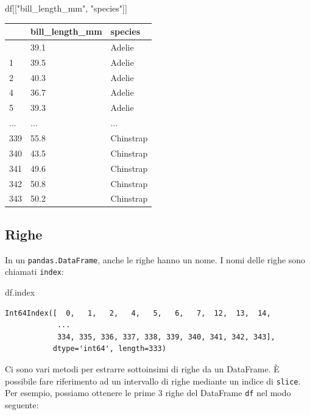 \documentclass[
  letterpaper,
  krantz2]{{[}./krantz{]}}
\newenvironment{Shaded}{\begin{snugshade}}{\end{snugshade}}
\newcommand{\NormalTok}[1]{\textcolor[rgb]{0.00,0.23,0.31}{#1}}
\newcommand{\StringTok}[1]{\textcolor[rgb]{0.13,0.47,0.30}{#1}}
\begin{document}
\begin{Shaded}
\begin{Highlighting}[]
\NormalTok{df[[}\StringTok{"bill\_length\_mm"}\NormalTok{, }\StringTok{"species"}\NormalTok{]]}
\end{Highlighting}
\end{Shaded}

\begin{longtable}[]{@{}lll@{}}
\toprule\noalign{}
& bill\_length\_mm & species \\
\midrule\noalign{}
\endhead
\bottomrule\noalign{}
\endlastfoot
0 & 39.1 & Adelie \\
1 & 39.5 & Adelie \\
2 & 40.3 & Adelie \\
4 & 36.7 & Adelie \\
5 & 39.3 & Adelie \\
... & ... & ... \\
339 & 55.8 & Chinstrap \\
340 & 43.5 & Chinstrap \\
341 & 49.6 & Chinstrap \\
342 & 50.8 & Chinstrap \\
343 & 50.2 & Chinstrap \\
\end{longtable}

\subsection{Righe}\label{righe}

In un \texttt{pandas.DataFrame}, anche le righe hanno un nome. I nomi
delle righe sono chiamati \texttt{index}:

\begin{Shaded}
\begin{Highlighting}[]
\NormalTok{df.index}
\end{Highlighting}
\end{Shaded}

\begin{verbatim}
Int64Index([  0,   1,   2,   4,   5,   6,   7,  12,  13,  14,
            ...
            334, 335, 336, 337, 338, 339, 340, 341, 342, 343],
           dtype='int64', length=333)
\end{verbatim}

Ci sono vari metodi per estrarre sottoinsimi di righe da un DataFrame. È
possibile fare riferimento ad un intervallo di righe mediante un indice
di \texttt{slice}. Per esempio, possiamo ottenere le prime 3 righe del
DataFrame \texttt{df} nel modo seguente:
\end{document}
